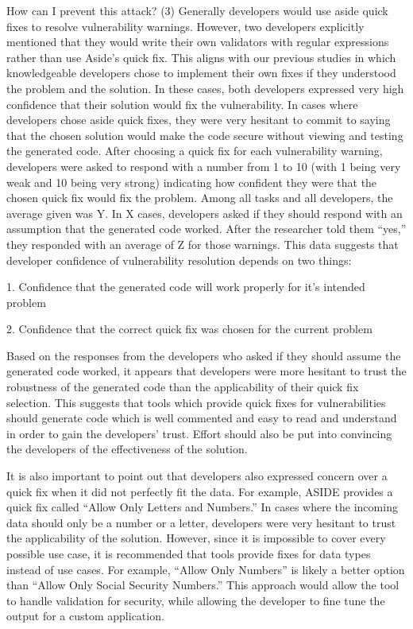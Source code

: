 \documentclass[twoside,letterpaper]{soups}
\begin{document}
How can I prevent this attack? (3) Generally developers would use aside quick fixes to resolve vulnerability warnings. However, two developers explicitly mentioned that they would write their own validators with regular expressions rather than use Aside's quick fix. This aligns with our previous studies in which knowledgeable developers chose to implement their own fixes if they understood the problem and the solution. In these cases, both developers expressed very high confidence that their solution would fix the vulnerability. In cases where developers chose aside quick fixes, they were very hesitant to commit to saying that the chosen solution would make the code secure without viewing and testing the generated code.  After choosing a quick fix for each vulnerability warning, developers were asked to respond with a number from 1 to 10 (with 1 being very weak and 10 being very strong) indicating how confident they were that the chosen quick fix would fix the problem. Among all tasks and all developers, the average given was Y.  In X cases, developers asked if they should respond with an assumption that the generated code worked.  After the researcher told them “yes,” they responded with an average of Z for those warnings. This data suggests that developer confidence of vulnerability resolution depends on two things:

1. Confidence that the generated code will work properly for it's intended problem

2. Confidence that the correct quick fix was chosen for the current problem

Based on the responses from the developers who asked if they should assume the generated code worked, it appears that developers were more hesitant to trust the robustness of the generated code than the applicability of their quick fix selection. This suggests that tools which provide quick fixes for vulnerabilities should generate code which is well commented and easy to read and understand in order to gain the developers' trust. Effort should also be put into convincing the developers of the effectiveness of the solution. 

It is also important to point out that developers also expressed concern over a quick fix when it did not perfectly fit the data. For example, ASIDE provides a quick fix called “Allow Only Letters and Numbers.” In cases where the incoming data should only be a number or a letter, developers were very hesitant to trust the applicability of the solution. However, since it is impossible to cover every possible use case, it is recommended that tools provide fixes for data types instead of use cases. For example, “Allow Only Numbers” is likely a better option than “Allow Only Social Security Numbers.” This approach would allow the tool to handle validation for security, while allowing the developer to fine tune the output for a custom application.
\end{document}
